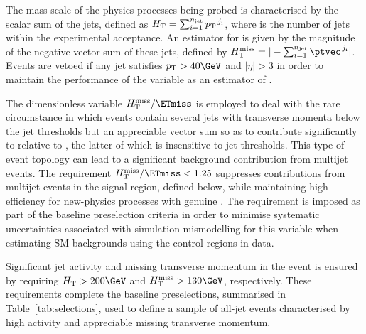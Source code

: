 The mass scale of the physics processes being probed is characterised
by the scalar \Pt sum of the jets, defined as $H_{\mathrm{T}} =
\sum_{i=1}^{n_{\text{jet}}} {p_{\text T}}^{\,j_\text{i}}$, where \njet is the number of
jets within the experimental acceptance. An estimator for \ETmiss is
given by the magnitude of the negative vector \ptvec sum of these
jets, defined by $\HTmiss = |-\sum_{i=1}^{\njet}
\ptvec^{\,j_\text{i}}|$. Events are vetoed if any jet satisfies $\Pt >
40\GeV$ and $|\eta| > 3$ in order to maintain the performance of the
variable \HTmiss as an estimator of \ETmiss.

The dimensionless variable $\HTmiss / \ETmiss$ is employed to deal
with the rare circumstance in which events contain several jets with
transverse momenta below the jet \Pt thresholds but an appreciable \Pt
vector sum so as to contribute significantly to \HTmiss relative to
\ETmiss, the latter of which is insensitive to jet \Pt
thresholds. This type of event topology can lead to a significant
background contribution from multijet events. The requirement $\HTmiss
/ \ETmiss < 1.25$ suppresses contributions from multijet events in the
signal region, defined below, while maintaining high efficiency for
new-physics processes with genuine \ptvecmiss. The requirement is
imposed as part of the baseline preselection criteria in order to
minimise systematic uncertainties associated with simulation
mismodelling for this variable when estimating SM backgrounds using
the control regions in data.

Significant jet activity and missing transverse momentum in the event
is ensured by requiring $\scalht > 200\GeV$ and $\HTmiss > 130\GeV$,
respectively. These requirements complete the baseline preselections,
summarised in Table~\ref{tab:selections}, used to define a sample of
all-jet events characterised by high activity and appreciable missing
transverse momentum.

